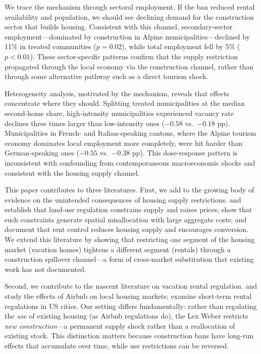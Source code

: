 \documentclass[12pt]{article}
\begin{document}
We trace the mechanism through sectoral employment. If the ban reduced rental availability and population, we should see declining demand for the construction sector that builds housing. Consistent with this channel, secondary-sector employment---dominated by construction in Alpine municipalities---declined by 11\% in treated communities ($p = 0.02$), while total employment fell by 5\% ($p < 0.01$). These sector-specific patterns confirm that the supply restriction propagated through the local economy via the construction channel, rather than through some alternative pathway such as a direct tourism shock.

Heterogeneity analysis, motivated by the mechanism, reveals that effects concentrate where they should. Splitting treated municipalities at the median second-home share, high-intensity municipalities experienced vacancy rate declines three times larger than low-intensity ones ($-0.58$ vs.\ $-0.18$ pp). Municipalities in French- and Italian-speaking cantons, where the Alpine tourism economy dominates local employment more completely, were hit harder than German-speaking ones ($-0.55$ vs.\ $-0.38$ pp). This dose-response pattern is inconsistent with confounding from contemporaneous macroeconomic shocks and consistent with the housing supply channel.

This paper contributes to three literatures. First, we add to the growing body of evidence on the unintended consequences of housing supply restrictions. \citet{glaeser2005impact} and \citet{saiz2010geographic} establish that land-use regulation constrains supply and raises prices; \citet{hsieh2019housing} show that such constraints generate spatial misallocation with large aggregate costs; \citet{diamond2019effects} and \citet{autor2014housing} document that rent control reduces housing supply and encourages conversion. We extend this literature by showing that restricting one segment of the housing market (vacation homes) tightens a different segment (rentals) through a construction spillover channel---a form of cross-market substitution that existing work has not documented.

Second, we contribute to the nascent literature on vacation rental regulation. \citet{koster2021short} and \citet{barron2021effect} study the effects of Airbnb on local housing markets; \citet{almagro2024short} examine short-term rental regulations in US cities. Our setting differs fundamentally: rather than regulating the \textit{use} of existing housing (as Airbnb regulations do), the Lex Weber restricts \textit{new construction}---a permanent supply shock rather than a reallocation of existing stock. This distinction matters because construction bans have long-run effects that accumulate over time, while use restrictions can be reversed.
\end{document}
